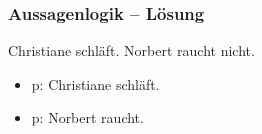 \begin{frame}
\frametitle{Aussagenlogik -- Lösung}

\begin{exe}
 Christiane schläft.
 Norbert raucht nicht.
\end{exe}

\begin{minipage}{0.4\textwidth}
	\centering
	\begin{itemize}
		\item[] \small{p: Christiane schläft.}
	\end{itemize}
\end{minipage}
%	
\begin{minipage}{0.5\textwidth}
	\centering
	\begin{itemize}
		\item[] \small{p: Norbert raucht.}
	\end{itemize}

\end{minipage}
\end{frame}


